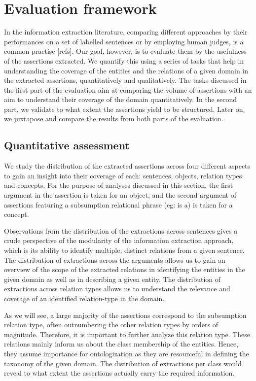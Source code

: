 \documentclass{llncs}
\begin{document}
\section{Evaluation framework}
\label{sec:framework}
In the information extraction literature, comparing different approaches by their performances on a set of labelled sentences or by employing human judges, is a common practise [refs]. Our goal, however, is to evaluate them by the usefulness of the assertions extracted. We quantify this using a series of tasks that help in understanding the coverage of the entities and the relations of a given domain in the extracted assertions, quantitatively and qualitatively.  The tasks discussed in the first part of the evaluation aim at comparing the volume of assertions with an aim to understand their coverage of the domain quantitatively. In the second part, we validate to what extent the assertions yield to be structured. Later on, we juxtapose and compare the results from both parts of the evaluation.

\subsection{Quantitative assessment}
We study the distribution of the extracted assertions across four different aspects to gain an insight into their coverage of each: sentences, objects, relation types and concepts. For the purpose of analyses discussed in this section, the first argument in the assertion is taken for an object, and the second argument of assertions featuring a subsumption relational phrase (eg: is a) is taken for a concept.

Observations from the distribution of the extractions across sentences gives a crude perspective of the modularity of the information extraction approach, which is its ability to identify multiple, distinct relations from a given sentence. The distribution of extractions across the arguments allows us to gain an overview of the scope of the extracted relations in identifying the entities in the given domain as well as in describing a given entity. The distribution of extractions across relation types allows us to understand the relevance and coverage of an identified relation-type in the domain. 

As we will see, a large majority of the assertions correspond to the subsumption relation type, often outnumbering the other relation types by orders of magnitude. Therefore, it is important to further analyze this relation type. These relations mainly inform us about the class membership of the entities. Hence, they assume importance for ontologization as they are resourceful in defining the taxonomy of the given domain. The distribution of extractions per class would reveal to what extent the assertions actually carry the required information.
\end{document}
